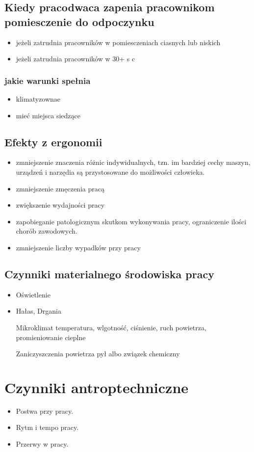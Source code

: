 \documentclass[11pt]{article}
\begin{document}
\subsection{Kiedy pracodwaca zapenia pracownikom pomiesczenie do odpoczynku}
\label{sec:org1198d6c}
\begin{itemize}
\item jeżeli zatrudnia pracowników w pomiesczeniach ciasnych lub niskich
\item jeżeli zatrudnia pracowników w 30+ s c
\end{itemize}
\subsubsection{jakie warunki spełnia}
\label{sec:org606ac86}
\begin{itemize}
\item klimatyzownae
\item mieć miejsca siedzące
\end{itemize}
\subsection{Efekty z ergonomii}
\label{sec:org302f2f5}
\begin{itemize}
\item zmniejszenie znaczenia różnic indywidualnych, tzn. im bardziej cechy maszyn, urządzeń i narzędia są przystosowane do możliwości człowieka.
\item zmniejszenie zmęczenia pracą
\item zwiększenie wydajności pracy
\item zapobieganie patologicznym skutkom wykonywania pracy, ograniczenie ilości chorób zawodowych.
\item zmniejszenie liczby wypadków przy pracy
\end{itemize}
\subsection{Czynniki materialnego środowiska pracy}
\label{sec:orge34dfc7}
\begin{itemize}
\item Oświetlenie
\item Hałas, Drgania
\item[{Mikroklimat}] temperatura, wlgotność, ciśnienie, ruch powietrza, promieniowanie cieplne
\item[{Zaniczyszczenia powietrza}] pył albo związek chemiczny
\end{itemize}
\section{Czynniki antroptechniczne}
\label{sec:org5cb7d21}
\begin{itemize}
\item Postwa przy pracy.
\item Rytm i tempo pracy.
\item Przerwy w pracy.
\end{itemize}
\end{document}
